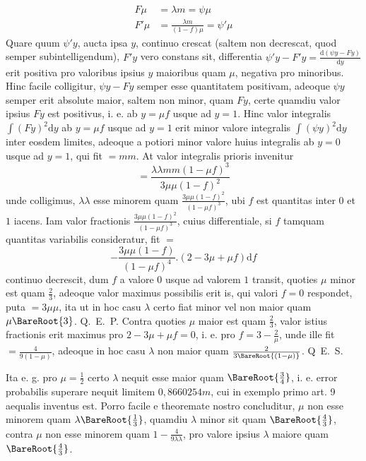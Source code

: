 \[
\begin{aligned}
F\mu&=\lambda m=\psi\mu\\[3pt]
F'\mu&=\frac{\lambda m}{(1-f)\mu}=\psi'\mu
\end{aligned}
\]
Quare quum \(\psi'y\), aucta ipsa \(y\), continuo crescat (saltem non decrescat, quod semper subintelligendum), \(F'y\) vero constans sit, differentia \(\psi'y-F'y=\frac{\mathrm{d}(\psi y-Fy)}{\mathrm{d}y}\) erit positiva pro valoribus ipsius \(y\) maioribus quam \(\mu\), negativa pro minoribus. Hinc facile colligitur, \(\psi y-Fy\) semper esse quantitatem positivam, adeoque \(\psi y\) semper erit absolute maior, saltem non minor, quam \(Fy\), certe quamdiu valor ipsius \(Fy\) est positivus, i. e. ab \(y=\mu f\) usque ad \(y=1\). Hinc valor integralis \(\int(Fy)^2\mathrm{d}y\) ab \(y=\mu f\) usque ad \(y=1\) erit minor valore integralis \(\int(\psi y)^2\mathrm{d}y\) inter eosdem limites, adeoque a potiori minor valore huius integralis ab \(y=0\) usque ad \(y=1\), qui fit \(=mm\). At valor integralis prioris invenitur
\[
=\frac{\lambda\lambda mm(1-\mu f)^3}{3\mu\mu(1-f)^2}
\]
unde colligimus, \(\lambda\lambda\) esse minorem quam \(\frac{3\mu\mu(1-f)^2}{(1-\mu f)^3}\), ubi \(f\) est quantitas inter \(0\) et \(1\) iacens. Iam valor fractionis \(\frac{3\mu\mu(1-f)^2}{(1-\mu f)^3}\), cuius differentiale, si \(f\) tamquam quantitas variabilis consideratur, fit \(=\)
\[
-\frac{3\mu\mu(1-f)}{(1-\mu f)^4}.(2-3\mu+\mu f)\mathrm{d}f
\]
continuo decrescit, dum \(f\) a valore \(0\) usque ad valorem \(1\) transit, quoties \(\mu\) minor est quam \(\tfrac23\), adeoque valor maximus possibilis erit is, qui valori \(f=0\) respondet, puta \(=3\mu\mu\), ita ut in hoc casu \(\lambda\) certo fiat minor vel non maior quam \(\mu\BareRoot{3}\). Q.~E.~P. Contra quoties \(\mu\) maior est quam \(\tfrac23\), valor istius fractionis erit maximus pro \(2-3\mu+\mu f=0\), i. e. pro \(f=3-\tfrac2\mu\), unde ille fit \(=\frac4{9(1-\mu)}\), adeoque in hoc casu \(\lambda\) non maior quam \(\frac2{3\BareRoot{(1-\mu)}}\). Q~E.~S.

Ita e. g. pro \(\mu=\tfrac12\) certo \(\lambda\) nequit esse maior quam \(\BareRoot{\tfrac34}\), i. e. error probabilis superare nequit limitem \(0{,}8660254m\), cui in exemplo primo art. 9 aequalis inventus est. Porro facile e theoremate nostro concluditur, \(\mu\) non esse minorem quam \(\lambda\BareRoot{\tfrac13}\), quamdiu \(\lambda\) minor sit quam \(\BareRoot{\tfrac43}\), contra \(\mu\) non esse minorem quam \(1-\frac4{9\lambda\lambda}\), pro valore ipsius \(\lambda\) maiore quam \(\BareRoot{\tfrac43}\).

